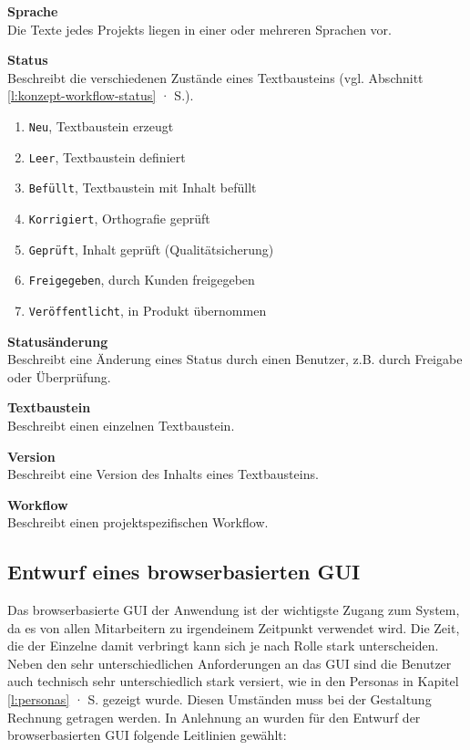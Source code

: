 \textsf{\textbf{Sprache}}\\Die Texte jedes Projekts liegen in einer oder mehreren Sprachen vor.

\begin{samepage}
\textsf{\textbf{Status}}\\Beschreibt die verschiedenen Zustände eines Textbausteins (vgl. Abschnitt \ref{l:konzept-workflow-status} · S.\pageref{l:konzept-workflow-status}).

\begin{enumerate}\itemsep -5pt
\item \texttt{Neu}, Textbaustein erzeugt
\item \texttt{Leer}, Textbaustein definiert
\item \texttt{Befüllt}, Textbaustein mit Inhalt befüllt
\item \texttt{Korrigiert}, Orthografie geprüft
\item \texttt{Geprüft}, Inhalt geprüft (Qualitätsicherung)
\item \texttt{Freigegeben}, durch Kunden freigegeben
\item \texttt{Veröffentlicht}, in Produkt übernommen
\end{enumerate}
\end{samepage}

\textsf{\textbf{Statusänderung}}\\Beschreibt eine Änderung eines Status durch einen Benutzer, z.B. durch Freigabe oder Überprüfung.

\textsf{\textbf{Textbaustein}}\\Beschreibt einen einzelnen Textbaustein.

\textsf{\textbf{Version}}\\Beschreibt eine Version des Inhalts eines Textbausteins.

\textsf{\textbf{Workflow}}\\Beschreibt einen projektspezifischen Workflow.

\pagebreak

\subsection{Entwurf eines browserbasierten GUI}\label{l:entwurf-gui}

Das browserbasierte GUI der Anwendung ist der wichtigste Zugang zum System, da es von allen Mitarbeitern zu irgendeinem Zeitpunkt verwendet wird. Die Zeit, die der Einzelne damit verbringt kann sich je nach Rolle stark unterscheiden. Neben den sehr unterschiedlichen Anforderungen an das GUI sind die Benutzer auch technisch sehr unterschiedlich stark versiert, wie in den Personas in Kapitel \ref{l:personas} · S.\pageref{l:personas} gezeigt wurde. Diesen Umständen muss bei der Gestaltung Rechnung getragen werden. In Anlehnung an \cite{nielsen} wurden für den Entwurf der browserbasierten GUI folgende Leitlinien gewählt:

